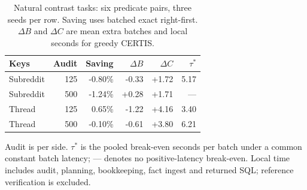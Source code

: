 \begin{table}[t]
\centering
\caption{Natural contrast tasks: six predicate pairs, three seeds per row. Saving uses batched exact right-first. $\Delta B$ and $\Delta C$ are mean extra batches and local seconds for greedy CERTIS.}
\label{tab:cost_boundary}
\begin{tabularx}{\linewidth}{Xrrrrr}
\toprule
\textbf{Keys} & \textbf{Audit} & \textbf{Saving} & $\Delta B$ & $\Delta C$ & $\tau^\ast$ \\
\midrule
Subreddit & 125 & -0.80\% & -0.33 & +1.72 & 5.17 \\
Subreddit & 500 & -1.24\% & +0.28 & +1.71 & --- \\
Thread & 125 & 0.65\% & -1.22 & +4.16 & 3.40 \\
Thread & 500 & -0.10\% & -0.61 & +3.80 & 6.21 \\
\bottomrule
\end{tabularx}
\par\smallskip\raggedright Audit is per side. $\tau^\ast$ is the pooled break-even seconds per batch under a common constant batch latency; --- denotes no positive-latency break-even. Local time includes audit, planning, bookkeeping, fact ingest and returned SQL; reference verification is excluded.
\end{table}
